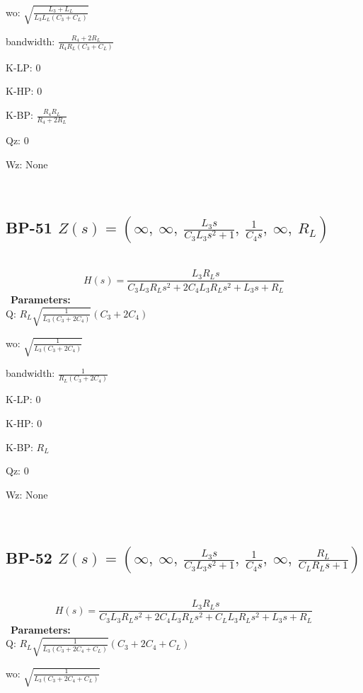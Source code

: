 \documentclass{article}
\begin{document}
wo: $\sqrt{\frac{L_{3} + L_{L}}{L_{3} L_{L} \left(C_{3} + C_{L}\right)}}$\ 

bandwidth: $\frac{R_{4} + 2 R_{L}}{R_{4} R_{L} \left(C_{3} + C_{L}\right)}$\ 

K-LP: $0$\ 

K-HP: $0$\ 

K-BP: $\frac{R_{4} R_{L}}{R_{4} + 2 R_{L}}$\ 

Qz: $0$\ 

Wz: $\text{None}$\ 

\ 

\subsection{BP-51 $Z(s) = \left( \infty, \  \infty, \  \frac{L_{3} s}{C_{3} L_{3} s^{2} + 1}, \  \frac{1}{C_{4} s}, \  \infty, \  R_{L}\right)$ } \ 
\textbf{\[H(s) = \frac{L_{3} R_{L} s}{C_{3} L_{3} R_{L} s^{2} + 2 C_{4} L_{3} R_{L} s^{2} + L_{3} s + R_{L}}\] } \ 
\textbf{Parameters:}\\ 

Q: $R_{L} \sqrt{\frac{1}{L_{3} \left(C_{3} + 2 C_{4}\right)}} \left(C_{3} + 2 C_{4}\right)$\ 

wo: $\sqrt{\frac{1}{L_{3} \left(C_{3} + 2 C_{4}\right)}}$\ 

bandwidth: $\frac{1}{R_{L} \left(C_{3} + 2 C_{4}\right)}$\ 

K-LP: $0$\ 

K-HP: $0$\ 

K-BP: $R_{L}$\ 

Qz: $0$\ 

Wz: $\text{None}$\ 

\ 

\subsection{BP-52 $Z(s) = \left( \infty, \  \infty, \  \frac{L_{3} s}{C_{3} L_{3} s^{2} + 1}, \  \frac{1}{C_{4} s}, \  \infty, \  \frac{R_{L}}{C_{L} R_{L} s + 1}\right)$ } \ 
\textbf{\[H(s) = \frac{L_{3} R_{L} s}{C_{3} L_{3} R_{L} s^{2} + 2 C_{4} L_{3} R_{L} s^{2} + C_{L} L_{3} R_{L} s^{2} + L_{3} s + R_{L}}\] } \ 
\textbf{Parameters:}\\ 

Q: $R_{L} \sqrt{\frac{1}{L_{3} \left(C_{3} + 2 C_{4} + C_{L}\right)}} \left(C_{3} + 2 C_{4} + C_{L}\right)$\ 

wo: $\sqrt{\frac{1}{L_{3} \left(C_{3} + 2 C_{4} + C_{L}\right)}}$\ 
\end{document}
